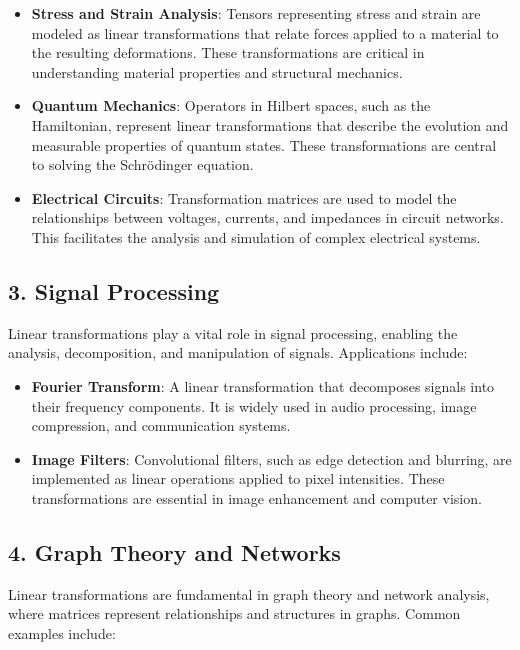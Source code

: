 \documentclass[11pt]{article}
\begin{document}
\begin{itemize}
    \item \textbf{Stress and Strain Analysis}:
    Tensors representing stress and strain are modeled as linear transformations that relate forces applied to a material to the resulting deformations. These transformations are critical in understanding material properties and structural mechanics.

    \item \textbf{Quantum Mechanics}:
    Operators in Hilbert spaces, such as the Hamiltonian, represent linear transformations that describe the evolution and measurable properties of quantum states. These transformations are central to solving the Schrödinger equation.

    \item \textbf{Electrical Circuits}:
    Transformation matrices are used to model the relationships between voltages, currents, and impedances in circuit networks. This facilitates the analysis and simulation of complex electrical systems.
\end{itemize}


\subsection*{3. Signal Processing}

Linear transformations play a vital role in signal processing, enabling the analysis, decomposition, and manipulation of signals. Applications include:

\begin{itemize}
    \item \textbf{Fourier Transform}:
    A linear transformation that decomposes signals into their frequency components. It is widely used in audio processing, image compression, and communication systems.

    \item \textbf{Image Filters}:
    Convolutional filters, such as edge detection and blurring, are implemented as linear operations applied to pixel intensities. These transformations are essential in image enhancement and computer vision.
\end{itemize}


\subsection*{4. Graph Theory and Networks}

Linear transformations are fundamental in graph theory and network analysis, where matrices represent relationships and structures in graphs. Common examples include:
\end{document}
